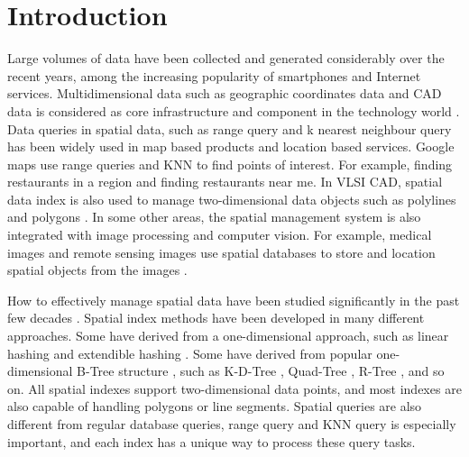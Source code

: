 \chapter{Introduction}

Large volumes of data have been collected and generated considerably over the recent years, among the increasing popularity of smartphones and Internet services. Multidimensional data such as geographic coordinates data and CAD data is considered as core infrastructure and component in the technology world \cite{gunther1990research, morton1966computer}. Data queries in spatial data, such as range query and k nearest neighbour query has been widely used in map based products and location based services. Google maps use range queries and KNN to find points of interest. For example, finding restaurants in a region and finding restaurants near me. In VLSI CAD, spatial data index is also used to manage two-dimensional data objects such as polylines and polygons \cite{liu1994evaluation}. In some other areas, the spatial management system is also integrated with image processing and computer vision. For example, medical images and remote sensing images use spatial databases to store and location spatial objects from the images \cite{borah2004improved, adhikary1996knowledge, mantel2004matching, tagare1997medical}. 

How to effectively manage spatial data have been studied significantly in the past few decades \cite{Gaede:1998fp, ooi1990efficient}. Spatial index methods have been developed in many different approaches. Some have derived from a one-dimensional approach, such as linear hashing \cite{larson1980linear} and extendible hashing \cite{fagin1979extendible}. Some have derived from popular one-dimensional B-Tree structure \cite{Bayer:2002ds}, such as K-D-Tree \cite{Bentley:1975gn}, Quad-Tree \cite{CSUR:tm}, R-Tree \cite{Guttman:1984ka}, and so on. All spatial indexes support two-dimensional data points, and most indexes are also capable of handling polygons or line segments. Spatial queries are also different from regular database queries, range query and KNN query is especially important, and each index has a unique way to process these query tasks. 



